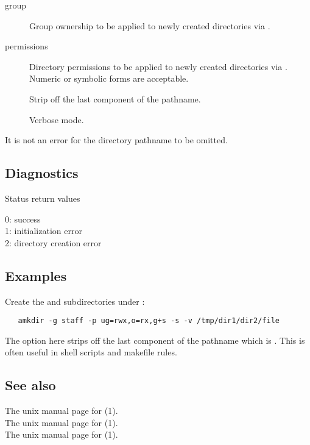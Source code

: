 \begin{description}
\item[ group]
   Group ownership to be applied to newly created directories via
   .

\item[ permissions]
   Directory permissions to be applied to newly created directories via
   .  Numeric or symbolic forms are acceptable.

\item[]
   Strip off the last component of the pathname.

\item[]
   Verbose mode.
\end{description}

\noindent
It is not an error for the directory pathname to be omitted.

\subsection*{Diagnostics}

Status return values
\begin{status}
   0:  success\\
   1:  initialization error\\
   2:  directory creation error
\end{status}

\subsection*{Examples}

Create the  and  subdirectories under :

\begin{verbatim}
   amkdir -g staff -p ug=rwx,o=rx,g+s -s -v /tmp/dir1/dir2/file
\end{verbatim}

\noindent
The  option here strips off the last component of the pathname which
is .  This is often useful in shell scripts and makefile rules.

\subsection*{See also}

The unix manual page for (1).\\
The unix manual page for (1).\\
The unix manual page for (1).


